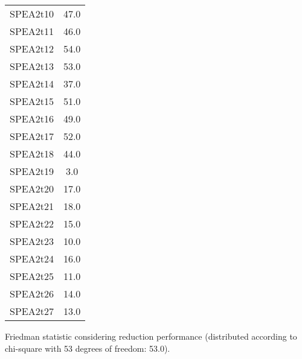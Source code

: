 \documentclass{article}
\begin{document}
\begin{table}[!htp]
\begin{tabular}{c|c}
SPEA2t10&47.0\\
SPEA2t11&46.0\\
SPEA2t12&54.0\\
SPEA2t13&53.0\\
SPEA2t14&37.0\\
SPEA2t15&51.0\\
SPEA2t16&49.0\\
SPEA2t17&52.0\\
SPEA2t18&44.0\\
SPEA2t19&3.0\\
SPEA2t20&17.0\\
SPEA2t21&18.0\\
SPEA2t22&15.0\\
SPEA2t23&10.0\\
SPEA2t24&16.0\\
SPEA2t25&11.0\\
SPEA2t26&14.0\\
SPEA2t27&13.0\\
\end{tabular}
\end{table}


Friedman statistic considering reduction performance (distributed according to chi-square with 53 degrees of freedom: 53.0).
\end{document}
